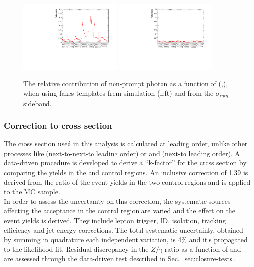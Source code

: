 \begin{figure}[h!]
  \centering
  \includegraphics[width=0.45\textwidth]{figures/photonpurity/fake_rate_MC}
  \includegraphics[width=0.45\textwidth]{figures/photonpurity/fake_rate_see}
  \caption{\label{fig:photon-purities} 
  The relative contribution of non-prompt photon as a function
  of (\njet,\HT), when using fakes templates from simulation (left)
  and from the $\sigma_{i\eta i\eta}$ sideband.}
\end{figure}


\subsubsection{Correction to \texorpdfstring{\gj}{photon+jets} cross section}
\label{sec:gj-kfactor}

The \gj cross section used in this analysis is calculated at leading
order, unlike other processes like \ttj (next-to-next-to leading
order) or \zj and \wj (next-to leading order).  A data-driven
procedure is developed to derive a ``k-factor'' for the \gj cross
section by comparing the yields in the \gj and \mmj control regions.
An inclusive correction of 1.39 is derived from the ratio of the event
yields in the two
control regions and is applied to the \gj MC sample. \\
In order to assess the uncertainty on this correction, the systematic
sources affecting the acceptance in the \mmj control region are varied
and the effect on the event yields is derived.  They include lepton
trigger, ID, isolation, tracking efficiency and jet energy
corrections.  The total systematic uncertainty, obtained by summing in
quadrature each independent variation, is 4\% and it's propagated to
the likelihood fit.  Residual discrepancy in the $Z/\gamma$ ratio as a
function of \scalht and \njet are assessed through the data-driven
test described in Sec.~\ref{sec:closure-tests}.


